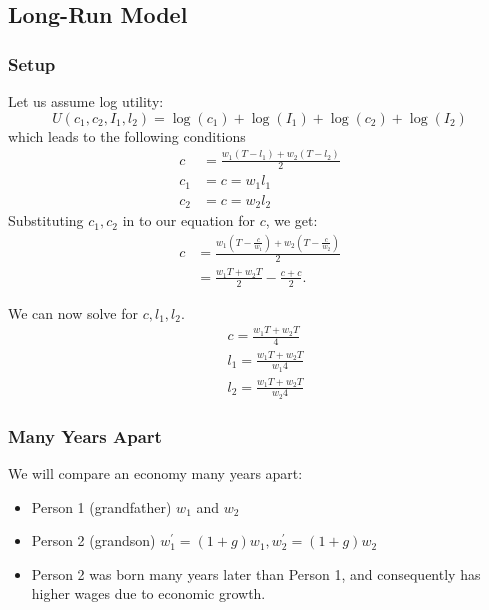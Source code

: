 \documentclass[11pt]{article}
\begin{document}
\subsection{Long-Run Model}
\subsubsection{Setup}

\begin{deriv}
Let us assume log utility:
\begin{equation}
U\left(c_1, c_2, I_1, l_2\right)=\log \left(c_1\right)+\log \left(I_1\right)+\log \left(c_2\right)+\log \left(I_2\right)
\end{equation}
which leads to the following conditions
\begin{equation}
\begin{aligned}
c & =\frac{w_1\left(T-l_1\right)+w_2\left(T-l_2\right)}{2} \\
c_1 & =c=w_1 l_1 \\
c_2 & =c=w_2 l_2
\end{aligned}
\end{equation}
Substituting $c_1,c_2$ in to our equation for $c$, we get:
\begin{equation}
\begin{aligned}
c & =\frac{w_1\left(T-\frac{c}{w_1}\right)+w_2\left(T-\frac{c}{w_2}\right)}{2} \\
& =\frac{w_1 T+w_2 T}{2}-\frac{c+c}{2}.
\end{aligned}
\end{equation}

We can now solve for $c,l_1,l_2$.
\begin{equation}
\begin{aligned}
& c=\frac{w_1 T+w_2 T}{4} \\
& l_1=\frac{w_1 T+w_2 T}{w_1 4} \\
& l_2=\frac{w_1 T+w_2 T}{w_2 4}
\end{aligned}
\end{equation}
\end{deriv}

\subsubsection{Many Years Apart}

We will compare an economy many years apart:
\begin{itemize}
    \item Person 1 (grandfather) $w_1$ and $w_2$
    \item Person 2 (grandson) $w_1^\prime = (1+g)w_1, w_2^\prime = (1+g)w_2$
    \item Person 2 was born many years later than Person 1, and consequently has higher wages due to economic growth.
\end{itemize}
\end{document}
